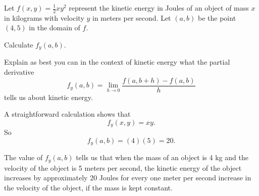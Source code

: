 \begin{activity} \label{A:10.2.6} Let $f(x,y) = \frac{1}{2}xy^2$ represent the kinetic energy in Joules of an object of mass $x$ in kilograms with velocity $y$ in meters per second. Let $(a,b)$ be the point $(4,5)$ in the domain of $f$.
	\ba
	\item Calculate $f_y(a,b)$.



	\item Explain as best you can in the context of kinetic energy what the partial derivative
\[f_y(a,b) = \lim_{h \to 0} \frac{f(a,b+h) - f(a,b)}{h}\]
tells us about kinetic energy.



	\ea

\end{activity}
\begin{smallhint}

\end{smallhint}
\begin{bighint}

\end{bighint}
\begin{activitySolution}
   \ba
    \item A straightforward calculation shows that 
\[f_y(x,y) = xy.\]
So 
\[f_y(a,b) = (4)(5) = 20.\]

    \item The value of $f_y(a,b)$ tells us that when the mass of an object is 4 kg and the velocity of the object is 5 meters per second, the kinetic energy of the object increases by approximately 20 Joules for every one meter per second increase in the velocity of the object, if the mass is kept constant. 

    \ea
\end{activitySolution}
\aftera
